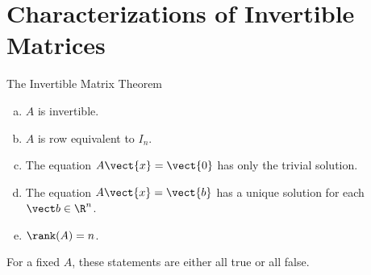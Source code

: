 \section[Invertibility]{Characterizations of Invertible Matrices}

\begin{frame}{The Invertible Matrix Theorem}
\begin{enumerate}[a.]
  \item $A$ is invertible.
  \item $A$ is row equivalent to $I_n$.
  \item The equation $A\vect{x}=\vect{0}$ has only the trivial solution.
  \item The equation $A\vect{x}=\vect{b}$ has a unique solution for each $\vect b\in\R^n$.
  \item $\rank(A)=n$.
\end{enumerate}
For a fixed $A$, these statements are either all true or all false.
\end{frame}

